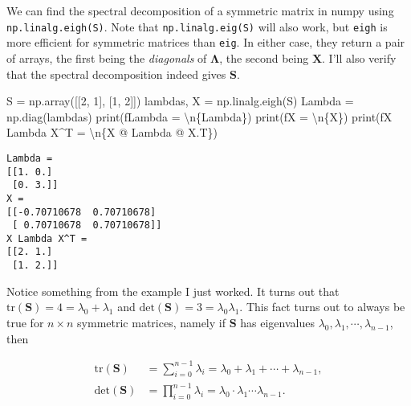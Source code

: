 \documentclass[
  letterpaper,
  DIV=11,
  numbers=noendperiod]{scrreprt}
\newenvironment{Shaded}{\begin{snugshade}}{\end{snugshade}}
\newcommand{\BuiltInTok}[1]{\textcolor[rgb]{0.00,0.23,0.31}{#1}}
\newcommand{\CharTok}[1]{\textcolor[rgb]{0.13,0.47,0.30}{#1}}
\newcommand{\DecValTok}[1]{\textcolor[rgb]{0.68,0.00,0.00}{#1}}
\newcommand{\NormalTok}[1]{\textcolor[rgb]{0.00,0.23,0.31}{#1}}
\newcommand{\OperatorTok}[1]{\textcolor[rgb]{0.37,0.37,0.37}{#1}}
\newcommand{\SpecialCharTok}[1]{\textcolor[rgb]{0.37,0.37,0.37}{#1}}
\newcommand{\SpecialStringTok}[1]{\textcolor[rgb]{0.13,0.47,0.30}{#1}}
\begin{document}
We can find the spectral decomposition of a symmetric matrix in numpy
using \texttt{np.linalg.eigh(S)}. Note that \texttt{np.linalg.eig(S)}
will also work, but \texttt{eigh} is more efficient for symmetric
matrices than \texttt{eig}. In either case, they return a pair of
arrays, the first being the \emph{diagonals} of \(\mathbf{\Lambda}\),
the second being \(\mathbf{X}\). I'll also verify that the spectral
decomposition indeed gives \(\mathbf{S}\).

\begin{Shaded}
\begin{Highlighting}[]
\NormalTok{S }\OperatorTok{=}\NormalTok{ np.array([[}\DecValTok{2}\NormalTok{, }\DecValTok{1}\NormalTok{], }
\NormalTok{              [}\DecValTok{1}\NormalTok{, }\DecValTok{2}\NormalTok{]])}
\NormalTok{lambdas, X }\OperatorTok{=}\NormalTok{ np.linalg.eigh(S)}
\NormalTok{Lambda }\OperatorTok{=}\NormalTok{ np.diag(lambdas)}
\BuiltInTok{print}\NormalTok{(}\SpecialStringTok{f\textquotesingle{}Lambda = }\CharTok{\textbackslash{}n}\SpecialCharTok{\{}\NormalTok{Lambda}\SpecialCharTok{\}}\SpecialStringTok{\textquotesingle{}}\NormalTok{)}
\BuiltInTok{print}\NormalTok{(}\SpecialStringTok{f\textquotesingle{}X = }\CharTok{\textbackslash{}n}\SpecialCharTok{\{}\NormalTok{X}\SpecialCharTok{\}}\SpecialStringTok{\textquotesingle{}}\NormalTok{)}
\BuiltInTok{print}\NormalTok{(}\SpecialStringTok{f\textquotesingle{}X Lambda X\^{}T = }\CharTok{\textbackslash{}n}\SpecialCharTok{\{}\NormalTok{X }\OperatorTok{@}\NormalTok{ Lambda }\OperatorTok{@}\NormalTok{ X}\SpecialCharTok{.}\NormalTok{T}\SpecialCharTok{\}}\SpecialStringTok{\textquotesingle{}}\NormalTok{)}
\end{Highlighting}
\end{Shaded}

\begin{verbatim}
Lambda = 
[[1. 0.]
 [0. 3.]]
X = 
[[-0.70710678  0.70710678]
 [ 0.70710678  0.70710678]]
X Lambda X^T = 
[[2. 1.]
 [1. 2.]]
\end{verbatim}

Notice something from the example I just worked. It turns out that
\(\text{tr}(\mathbf{S}) = 4 = \lambda_0 + \lambda_1\) and
\(\text{det}(\mathbf{S}) = 3 = \lambda_0 \lambda_1\). This fact turns
out to always be true for \(n \times n\) symmetric matrices, namely if
\(\mathbf{S}\) has eigenvalues
\(\lambda_0, \lambda_1, \cdots, \lambda_{n-1}\), then

\begin{align*}
\text{tr}(\mathbf{S}) &= \sum_{i=0}^{n-1} \lambda_i = \lambda_0 + \lambda_1 + \cdots + \lambda_{n-1}, \\
\text{det}(\mathbf{S}) &= \prod_{i=0}^{n-1} \lambda_i = \lambda_0 \cdot \lambda_1 \cdots \lambda_{n-1}.
\end{align*}
\end{document}
